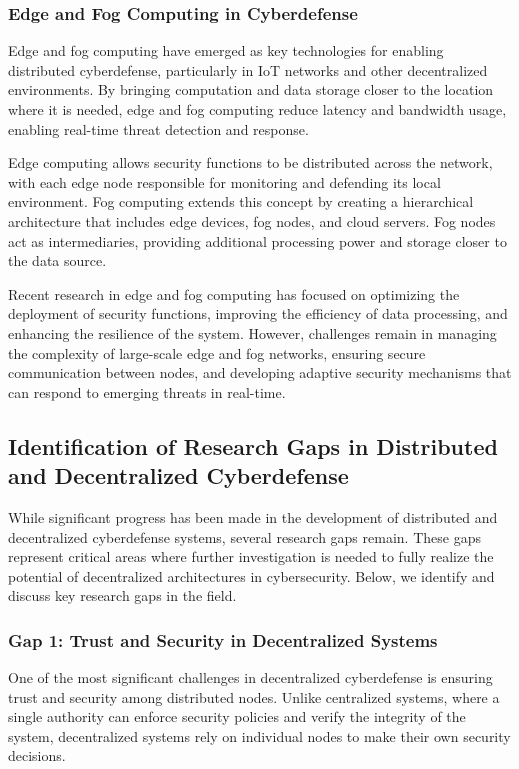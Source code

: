 \subsubsection{Edge and Fog Computing in Cyberdefense}

Edge and fog computing have emerged as key technologies for enabling distributed cyberdefense, particularly in IoT networks and other decentralized environments. By bringing computation and data storage closer to the location where it is needed, edge and fog computing reduce latency and bandwidth usage, enabling real-time threat detection and response.

Edge computing allows security functions to be distributed across the network, with each edge node responsible for monitoring and defending its local environment. Fog computing extends this concept by creating a hierarchical architecture that includes edge devices, fog nodes, and cloud servers. Fog nodes act as intermediaries, providing additional processing power and storage closer to the data source.

Recent research in edge and fog computing has focused on optimizing the deployment of security functions, improving the efficiency of data processing, and enhancing the resilience of the system. However, challenges remain in managing the complexity of large-scale edge and fog networks, ensuring secure communication between nodes, and developing adaptive security mechanisms that can respond to emerging threats in real-time.

\subsection{Identification of Research Gaps in Distributed and Decentralized Cyberdefense}

While significant progress has been made in the development of distributed and decentralized cyberdefense systems, several research gaps remain. These gaps represent critical areas where further investigation is needed to fully realize the potential of decentralized architectures in cybersecurity. Below, we identify and discuss key research gaps in the field.

\subsubsection{Gap 1: Trust and Security in Decentralized Systems}

One of the most significant challenges in decentralized cyberdefense is ensuring trust and security among distributed nodes. Unlike centralized systems, where a single authority can enforce security policies and verify the integrity of the system, decentralized systems rely on individual nodes to make their own security decisions.

